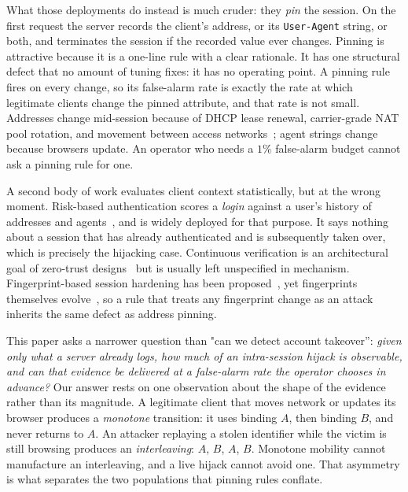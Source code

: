 \documentclass[conference]{IEEEtran}
\begin{document}
What those deployments do instead is much cruder: they \emph{pin} the session.
On the first request the server records the client's address, or its
\texttt{User-Agent} string, or both, and terminates the session if the recorded
value ever changes.  Pinning is attractive because it is a one-line rule with a
clear rationale.  It has one structural defect that no amount of tuning fixes:
it has no operating point.  A pinning rule fires on every change, so its
false-alarm rate is exactly the rate at which legitimate clients change the
pinned attribute, and that rate is not small.  Addresses change mid-session
because of DHCP lease renewal, carrier-grade NAT pool rotation, and movement
between access networks~\cite{padmanabhan2016dynamic,richter2016cgn}; agent
strings change because browsers update.  An operator who needs a $1\%$
false-alarm budget cannot ask a pinning rule for one.

A second body of work evaluates client context statistically, but at the wrong
moment.  Risk-based authentication scores a \emph{login} against a user's
history of addresses and agents~\cite{freeman2016whoareyou,wiefling2019rba},
and is widely deployed for that purpose.  It says nothing about a session that
has already authenticated and is subsequently taken over, which is precisely the
hijacking case.  Continuous verification is an architectural goal of zero-trust
designs~\cite{nist2020zerotrust} but is usually left unspecified in mechanism.
Fingerprint-based session hardening has been proposed~\cite{unger2013shpf}, yet
fingerprints themselves evolve~\cite{vastel2018fpstalker,laperdrix2020survey},
so a rule that treats any fingerprint change as an attack inherits the same
defect as address pinning.

This paper asks a narrower question than "can we detect account takeover'': \emph{
given only what a server already logs, how much of an intra-session hijack is
observable, and can that evidence be delivered at a false-alarm rate the
operator chooses in advance?}  Our answer rests on one observation about the
shape of the evidence rather than its magnitude.  A legitimate client that moves
network or updates its browser produces a \emph{monotone} transition: it uses
binding $A$, then binding $B$, and never returns to $A$.  An attacker replaying
a stolen identifier while the victim is still browsing produces an
\emph{interleaving}: $A$, $B$, $A$, $B$.  Monotone mobility cannot manufacture an
interleaving, and a live hijack cannot avoid one.  That asymmetry is what
separates the two populations that pinning rules conflate.
\end{document}
